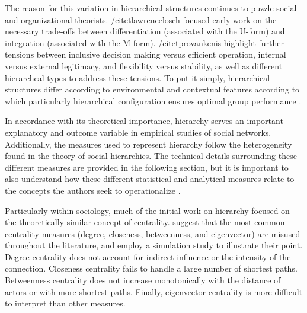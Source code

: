 \documentclass[3p,times]{elsarticle}
\begin{document}
The reason for this variation in hierarchical structures continues to puzzle social and organizational theorists. /citet{lawrencelosch} focused early work on the necessary trade-offs between differentiation (associated with the U-form) and integration (associated with the M-form). /citet{provankenis} highlight further  tensions between inclusive decision making versus efficient operation, internal versus external legitimacy, and flexibility versus stability, as well as different hierarchcal types to address these tensions. To put it simply, hierarchical structures differ according to environmental and contextual features according to which particularly hierarchical configuration ensures optimal group performance \cite{katz, katzlazer}. 

In accordance with its theoretical importance, hierarchy serves an important explanatory and outcome variable in empirical studies of social networks. Additionally, the measures used to represent hierarchy follow the heterogeneity found in the theory of social hierarchies. The technical details surrounding these different measures are provided in the following section, but it is important to also understand how these different statistical and analytical measures relate to the concepts the authors seek to operationalize \cite{friedkin91, gomezetal03}. 

Particularly within sociology, much of the initial work on hierarchy focused on the theoretically similar concept of centrality. \cite{landherr_etal10} suggest that the most common centrality measures (degree, closeness, betweenness, and eigenvector) are misused throughout the literature, and employ a simulation study to illustrate their point. Degree centrality does not account for indirect influence or the intensity of the connection. Closeness centrality fails to handle a large number of shortest paths. Betweenness centrality does not increase monotonically with the distance of actors or with more shortest paths. Finally, eigenvector centrality is more difficult to interpret than other measures.
\end{document}
